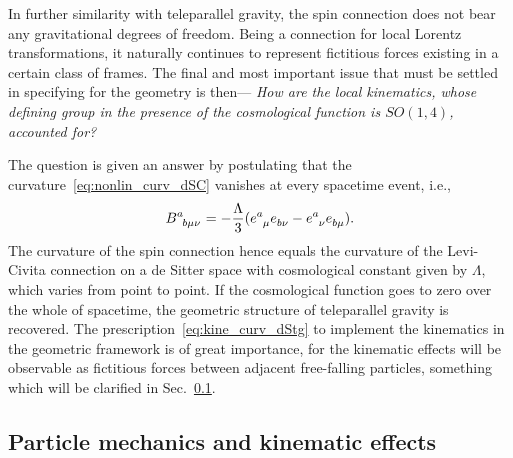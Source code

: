 \documentclass[%
5p,
times,
sort&compress
]{elsarticle}
\newcommand{\ind}{\indices}
\begin{document}
In further similarity with teleparallel gravity, the spin 
connection does not bear any gravitational degrees of freedom.  
Being a connection for local Lorentz transformations, it 
naturally continues to represent fictitious forces existing in 
a certain class of frames. The final and most important issue 
that must be settled in specifying for the geometry is then--- 
\emph{How are the local kinematics, whose defining group in the 
  presence of the cosmological function is $SO(1,4)$, accounted 
  for?}

The question is given an answer by postulating that the 
curvature~\eqref{eq:nonlin_curv_dSC} vanishes at every spacetime 
event, i.e.,
\begin{equation}
\label{eq:kine_curv_dStg}
  B\ind{^a_{b\mu\nu}} = -\frac{\Lambda}{3} (e\ind{^a_\mu} 
  e\ind{_{b\nu}} - e\ind{^a_\nu} e\ind{_{b\mu}}).
\end{equation}
The curvature of the spin connection hence equals the curvature 
of the Levi-Civita connection on a de Sitter space with 
cosmological constant given by $\Lambda$, which varies from point 
to point. If the cosmological function goes to zero over the 
whole of spacetime, the geometric structure of teleparallel 
gravity is recovered. The prescription~\eqref{eq:kine_curv_dStg} 
to implement the kinematics in the geometric framework is of 
great importance, for the kinematic effects will be observable as 
fictitious forces between adjacent free-falling particles, 
something which will be clarified in Sec.~\ref{ssec:part_mech}.


\subsection{Particle mechanics and kinematic effects}
\label{ssec:part_mech}
\end{document}

